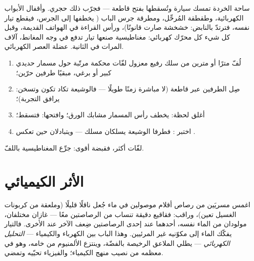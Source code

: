 \begin{example}\label{ex:g8:electric-current-effects:uses}
 ساحة الخردة تمسك سيارة  وتُسقطها بفتح
قاطعة --- فجرّب ذلك  حجري. وأقفال الأبواب الكهربائية،
وطقطقة المُرحِّل، ومطرقة جرس الباب ( يخطفها إلى
الجرس، فيقطع تيار نفسه، فترتدّ بالنابض: خشخشة صارت قانونًا)،
ورأس القراءة في الهواتف القديمة، وقبل كل شيء كل محرّك كهربائي:
مغناطيسية صنعها تيار تدفع في وجه المغانط، آلاف المرات في
الثانية.  عضلة العصر الكهربائي.
\end{example}

\begin{method}\label{met:g8:electric-current-effects:wind}
\begin{enumerate}
  \item لُفّ مترًا أو مترين من سلك رفيع معزول لفّات محكمة
        مرتّبة حول مسمار حديدي كبير أو برغي، مبقيًا طرفين
        حرّين؛
  \item صِل الطرفين  عبر قاطعة (لا مباشرة زمنًا طويلًا
        --- فالوشيعة تكاد تكون  وتسخن:  يرافق التجربة)؛
  \item أغلق  لحظة: يخطف رأس المسمار مشابك الورق؛
        وافتحها: فتسقط؛
  \item اختبر : فطرفا الوشيعة يسلكان مسلك   --- ويتبادلان حين تعكس .
\end{enumerate}
لفّات أكثر، فقبضة أقوى: جرِّع المغناطيسية باللفّ.
\end{method}

\section{الأثر الكيميائي}

\begin{example}\label{ex:g8:electric-current-effects:electrolysis}
اغمس مسريَين من رصاص أقلام موصولين  في ماء جُعل ناقلًا
قليلًا (وملعقة من كربونات الغسيل تعين)، وراقب: فقاقيع دقيقة
تنساب من الرصاصتين معًا --- غازان مختلفان، مولودان من الماء
نفسه،  أحدهما عند إحدى الرصاصتين ضِعف الآخر عند الأخرى.
فالتيار يفكّك الماء إلى مكوّنيه غير المرئيين. وهذا الباب بين
الكهرباء والكيمياء --- \emph{التحليل الكهربائي} --- يطلي
الملاعق الرخيصة بالفضّة، وينتزع الألمنيوم من خامه، وهو في
معظمه من نصيب منهج الكيمياء؛ والفيزياء تحيّيه وتمضي.
\end{example}

